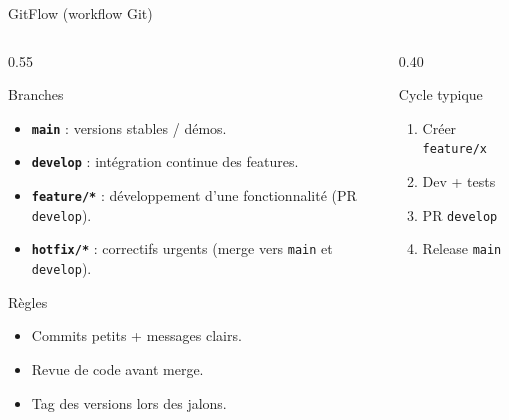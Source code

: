 \documentclass[aspectratio=169, 11pt]{beamer}
\begin{document}
\begin{frame}{GitFlow (workflow Git)}
    \begin{columns}[T,onlytextwidth]
        \begin{column}{0.55\textwidth}
            \begin{block}{Branches}
                \begin{itemize}\small
                    \item \textbf{\texttt{main}} : versions stables / démos.
                    \item \textbf{\texttt{develop}} : intégration continue des features.
                    \item \textbf{\texttt{feature/*}} : développement d’une fonctionnalité (PR \textrightarrow{} \texttt{develop}).
                    \item \textbf{\texttt{hotfix/*}} : correctifs urgents (merge vers \texttt{main} et \texttt{develop}).
                \end{itemize}
            \end{block}
            \vspace{0.2cm}
            \begin{block}{Règles}
                \begin{itemize}\small
                    \item Commits petits + messages clairs.
                    \item Revue de code avant merge.
                    \item Tag des versions lors des jalons.
                \end{itemize}
            \end{block}
        \end{column}
        \hfill
        \begin{column}{0.40\textwidth}
            \begin{block}{Cycle typique}
                \begin{enumerate}\small
                    \item Créer \texttt{feature/x}
                    \item Dev + tests
                    \item PR \textrightarrow{} \texttt{develop}
                    \item Release \textrightarrow{} \texttt{main}
                \end{enumerate}
            \end{block}
        \end{column}
    \end{columns}
\end{frame}
\end{document}
